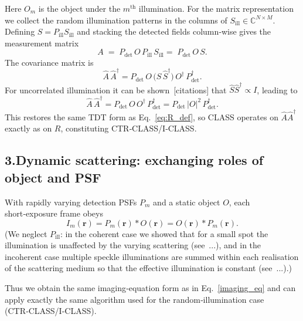\documentclass[12pt]{article}
\begin{document}
Here $O_m$ is the object under the $m^{\text{th}}$ illumination.  For the
matrix representation we collect the random illumination patterns in the
columns of $S_{\text{ill}}\in\mathbb{C}^{N\times M}$.
Defining $S = P_{\text{ill}} S_{\text{ill}}$ and stacking the detected
fields column‑wise gives the measurement matrix
\begin{equation}
A \;=\; P_{\text{det}}\,
        O\,
        P_{\text{ill}}\,
        S_{\text{ill}}
     =\; P_{\text{det}}\,
        O\,
        S.
\label{eq:A_def}
\end{equation}
The covariance matrix is
\begin{equation}
\hat{A}\,\hat{A}^{\dagger}
      = P_{\text{det}}\,
        O\,
        \bigl(\hat{S}\,\hat{S}^{\dagger}\bigr)\,
        O^{\dagger}\,
        P_{\text{det}}^{\dagger}.
\label{eq:A_cov}
\end{equation}
For uncorrelated illumination it can be shown [citations] that
$\hat{S}\hat{S}^{\dagger}\propto I$, leading to
\begin{equation}
\hat{A}\,\hat{A}^{\dagger}
      = P_{\text{det}}\,
        O\,O^{\dagger}\,
        P_{\text{det}}^{\dagger}
      = P_{\text{det}}\,
        |O|^{2}\,
        P_{\text{det}}^{\dagger}.
\label{eq:A_cov2}
\end{equation}
This restores the same TDT form as Eq.~\eqref{eq:R_def}, so CLASS operates
on $\hat{A}\hat{A}^{\dagger}$ exactly as on $R$, constituting
CTR‑CLASS/I‑CLASS.

\subsection{3.\quad Dynamic scattering: exchanging roles of object and PSF}
\label{subsec:dyn_class}

With rapidly varying detection PSFs $P_{m}$ and a static object $O$, each
short‑exposure frame obeys
\[
I_{m}(\mathbf r)
  = P_{m}(\mathbf r)\ast O(\mathbf r)
  = O(\mathbf r)\ast P_{m}(\mathbf r).
\]
(We neglect $P_{\text{ill}}$: in the coherent case we showed that for a
small spot the illumination is unaffected by the varying scattering
(see~...), and in the incoherent case multiple speckle illuminations are
summed within each realisation of the scattering medium so that the
effective illumination is constant (see~...).)

Thus we obtain the same imaging‑equation form as in
Eq.~\eqref{imaging_eq} and can apply exactly the same algorithm used for
the random‑illumination case (CTR‑CLASS/I‑CLASS).







\end{document}
